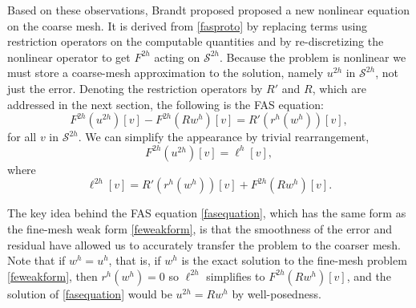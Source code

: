 \documentclass[letterpaper,final,12pt,reqno]{amsart}
\begin{document}
Based on these observations, Brandt proposed proposed a new nonlinear equation on the coarse mesh.  It is derived from \eqref{fasproto} by replacing terms using restriction operators on the computable quantities and by re-discretizing the nonlinear operator to get $F^{2h}$ acting on $\mathcal{S}^{2h}$.  Because the problem is nonlinear we must store a coarse-mesh approximation   to the solution, namely $u^{2h}$ in $\mathcal{S}^{2h}$, not just the error.  Denoting the restriction operators by $R'$ and $R$, which are addressed in the next section, the following is the FAS equation:
\begin{equation}
  F^{2h}(u^{2h})[v] - F^{2h}(R w^h)[v] = R' (r^h(w^h))[v], \label{faspreequation}
\end{equation}
for all $v$ in $\mathcal{S}^{2h}$.  We can simplify the appearance by trivial rearrangement,
\begin{equation}
  F^{2h}(u^{2h})[v] = \ell^h[v], \label{fasequation}
\end{equation}
where
\begin{equation}
  \ell^{2h}[v] = R' (r^h(w^h))[v] + F^{2h}(R w^h)[v]. \label{fasell}
\end{equation}

The key idea behind the FAS equation \eqref{fasequation}, which has the same form as the fine-mesh weak form \eqref{feweakform}, is that the smoothness of the error and residual have allowed us to accurately transfer the problem to the coarser mesh.  Note that if $w^h=u^h$, that is, if $w^h$ is the exact solution to the fine-mesh problem \eqref{feweakform}, then $r^h(w^h)=0$ so $\ell^{2h}$ simplifies to $F^{2h}(R w^h)[v]$, and the solution of \eqref{fasequation} would be $u^{2h} = R w^h$ by well-posedness.
\end{document}
